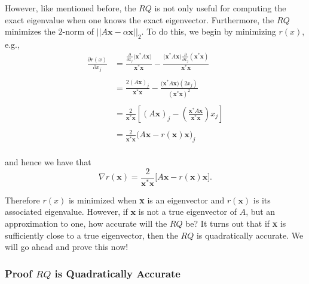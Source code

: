 \documentclass[paper=a4, fontsize=11pt]{scrartcl} %
\numberwithin{equation}{section} %
\numberwithin{figure}{section} %
\numberwithin{table}{section} %
\begin{document}
However, like mentioned before, the $RQ$ is not only useful for computing the exact eigenvalue when one knows the exact eigenvector. Furthermore, the $RQ$ minimizes the $2$-norm of $||A\textbf{x}-\alpha\textbf{x}||_2.$ To do this, we begin by minimizing $r(x)$, e.g.,
\begin{align*}
\frac{ \partial r(x) }{ \partial x_j } &= \frac{  \frac{ \partial}{ \partial x_j} \big( \textbf{x}^* A\textbf{x} \big) }{  \textbf{x}^*\textbf{x}  } - \frac{ \big(\textbf{x}^*A\textbf{x}  \big) \frac{\partial}{\partial x_j }  (\textbf{x}^*\textbf{x} )    }{  \textbf{x}^* \textbf{x} } \\ \\
%
	&= \frac{ 2(A\textbf{x})_j }{   \textbf{x}^*\textbf{x} } - \frac{  \big(\textbf{x}^*A\textbf{x}\big)(2x_j)    }{ ( \textbf{x}^*\textbf{x})^2      } \\ \\ 
	&= \frac{2}{ \textbf{x}^*\textbf{x} } \left[  (A\textbf{x})_j - \left( \frac{  \textbf{x}^*A\textbf{x} }{ \textbf{x}^*\textbf{x} }      \right) x_j       \right] \\ \\
	&= \frac{2}{ \textbf{x}^*\textbf{x} } \bigg(  A\textbf{x} - r(\textbf{x}) \textbf{x}   \bigg)_j \\
\end{align*}

and hence we have that $$\nabla r(\textbf{x}) = \frac{2}{ \textbf{x}^*\textbf{x} } \big[  A\textbf{x} - r(\textbf{x}) \textbf{x} \big].$$

Therefore $r(x)$ is minimized when \textbf{x} is an eigenvector and $r(\textbf{x})$ is its associated eigenvalue. However, if $\textbf{x}$ is not a true eigenvector of $A$, but an approximation to one, how accurate will the $RQ$ be? It turns out that if \textbf{x} is sufficiently close to a true eigenvector, then the $RQ$ is quadratically accurate. We will go ahead and prove this now!

%
%
\subsubsection{Proof $RQ$ is Quadratically Accurate}
\end{document}
